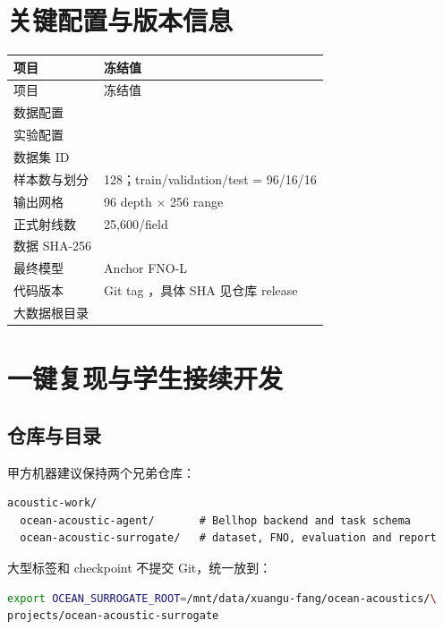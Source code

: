 \documentclass[UTF8,11pt]{ctexart}
\newcommand{\BestModel}{Anchor FNO-L}
\begin{document}
\appendix
\section{关键配置与版本信息}

\begin{longtable}{L{4.4cm}L{9.6cm}}
\toprule
项目 & 冻结值 \\
\midrule
\endfirsthead
\toprule
项目 & 冻结值 \\
\midrule
\endhead
数据配置 &  \\
实验配置 &  \\
数据集 ID &  \\
样本数与划分 & 128；train/validation/test = 96/16/16 \\
输出网格 & 96 depth $\times$ 256 range \\
正式射线数 & 25,600/field \\
数据 SHA-256 &  \\
最终模型 & \BestModel \\
代码版本 & Git tag ，具体 SHA 见仓库 release \\
大数据根目录 &  \\
\bottomrule
\end{longtable}

\section{一键复现与学生接续开发}

\subsection{仓库与目录}

甲方机器建议保持两个兄弟仓库：
\begin{lstlisting}[style=repro]
acoustic-work/
  ocean-acoustic-agent/       # Bellhop backend and task schema
  ocean-acoustic-surrogate/   # dataset, FNO, evaluation and report
\end{lstlisting}

大型标签和 checkpoint 不提交 Git，统一放到：
\begin{lstlisting}[style=repro,language=bash]
export OCEAN_SURROGATE_ROOT=/mnt/data/xuangu-fang/ocean-acoustics/\
projects/ocean-acoustic-surrogate
\end{lstlisting}
\end{document}
